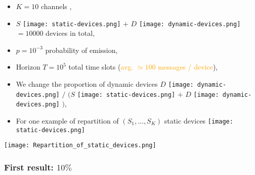 \begin{frameO}


        \begin{itemize}
            \item
                  \(K = 10\) channels \slotmachine,
            \item
                  \(S\) \texttt{[image: static-devices.png]}
                  \(+\)
                  \(D\) \texttt{[image: dynamic-devices.png]}
                  \(= 10000\) devices
                  in total,
            \pause
            \item
                  \(p = 10^{-3}\) probability of emission,
            \item
                  Horizon \(T = 10^5\) total time slots
                  (\textcolor{orange}{avg. \(\simeq 100\) messages \(/\) device}),
            \pause
            \item
                  We change the proportion of dynamic devices
                  \(D\)
                  \texttt{[image: dynamic-devices.png]}
                  \(/\)
                  \((S\)
                  \texttt{[image: static-devices.png]}
                  \(+\)
                  \(D\)
                  \texttt{[image: dynamic-devices.png]}
                  \()\),
            \item
                  For one example of repartition of \((S_1,\dots,S_{K})\) static devices \texttt{[image: static-devices.png]}
        \end{itemize}
        \vspace*{-10pt}
        \begin{center}
            \texttt{[image: Repartition\_of\_static\_devices.png]}
        \end{center}


\end{frameO}



\subsubsection{First result: $10\%$}

